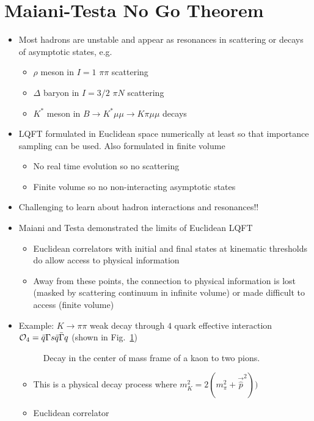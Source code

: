 \newpage

\section{Maiani-Testa No Go Theorem}
\begin{itemize}
    \item Most hadrons are unstable and appear as resonances in scattering or decays of asymptotic states, e.g.
    \begin{itemize}
        \item $\rho$ meson in $I=1$ $\pi \pi$ scattering
        \item $\Delta$ baryon in $I= 3/2$ $\pi N$ scattering
        \item $K^*$ meson in $B \to K^* \mu \mu \to K \pi \mu \mu$ decays
    \end{itemize}
    \item LQFT formulated in Euclidean space numerically at least so that importance sampling can be used. Also formulated in finite volume
    \begin{itemize}
        \item No real time evolution so no scattering
        \item Finite volume so no non-interacting asymptotic states
    \end{itemize}
    \item Challenging to learn about hadron interactions and resonances!!
    \item Maiani and Testa demonstrated the limits of Euclidean LQFT
    \begin{itemize}
        \item Euclidean correlators with initial and final states at kinematic thresholds do allow access to physical information
        \item Away from these points, the connection to physical information is lost (masked by scattering continuum in infinite volume) or made difficult to access (finite volume)
    \end{itemize}
    \item Example: $K \to \pi \pi$ weak decay through $4$ quark effective interaction ${\cal O}_4 = \bar{q} \Gamma s \bar{q} \bar{\Gamma} q$ (shown in Fig.~\ref{fig:kpipi})
    \begin{figure}
        \centering
        \caption{Decay in the center of mass frame of a kaon to two pions.}
        \label{fig:kpipi}
    \end{figure}
    \begin{itemize}
        \item This is a physical decay process where $m_K^2 = 2(m_\pi^2 + \vec{\hat{p}}^2))$
        \item Euclidean correlator
    \end{itemize}
\end{itemize}
